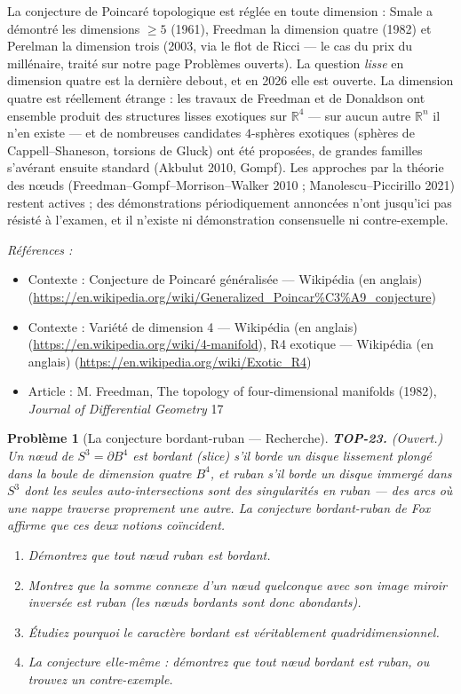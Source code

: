 \documentclass[11pt]{article}
\newtheorem{problem}{Problème}
\newenvironment{refs}{\par\small\noindent\emph{Références :}\begin{itemize}\setlength\itemsep{0pt}}{\end{itemize}\normalsize}
\begin{document}
\noindent La conjecture de Poincaré topologique est réglée en toute dimension : Smale a démontré
les dimensions $ \ge 5 $ (1961), Freedman la dimension quatre (1982) et Perelman la dimension trois
(2003, via le flot de Ricci --- le cas du prix du millénaire, traité sur notre page Problèmes ouverts). La
question \textit{lisse} en dimension quatre est la dernière debout, et en 2026 elle est ouverte. La dimension
quatre est réellement étrange : les travaux de Freedman et de Donaldson ont ensemble produit des structures
lisses exotiques sur $ \mathbb{R}^4 $ --- sur aucun autre $ \mathbb{R}^n $ il n'en existe --- et de
nombreuses candidates $ 4 $-sphères exotiques (sphères de Cappell--Shaneson, torsions de Gluck) ont été
proposées, de grandes familles s'avérant ensuite standard (Akbulut 2010, Gompf). Les approches par la
théorie des n\oe{}uds (Freedman--Gompf--Morrison--Walker 2010 ; Manolescu--Piccirillo 2021) restent actives ; des
démonstrations périodiquement annoncées n'ont jusqu'ici pas résisté à l'examen, et il n'existe ni
démonstration consensuelle ni contre-exemple.

\begin{refs}
\item Contexte : Conjecture de Poincaré généralisée --- Wikipédia (en anglais) (\url{https://en.wikipedia.org/wiki/Generalized_Poincar%C3%A9_conjecture})
\item Contexte : Variété de dimension 4 --- Wikipédia (en anglais) (\url{https://en.wikipedia.org/wiki/4-manifold}), R4 exotique --- Wikipédia (en anglais) (\url{https://en.wikipedia.org/wiki/Exotic_R4})
\item Article : M. Freedman, \og{} The topology of four-dimensional manifolds \fg{} (1982), \textit{Journal of Differential Geometry} 17
\end{refs}

\bigskip

\begin{problem}[{La conjecture bordant-ruban --- Recherche}]
\textbf{TOP-23.} (Ouvert.) Un n\oe{}ud de $ S^3 = \partial B^4 $ est \textit{bordant} (slice) s'il borde
un disque lissement plongé dans la boule de dimension quatre $ B^4 $, et \textit{ruban} s'il borde un
disque immergé dans $ S^3 $ dont les seules auto-intersections sont des singularités en ruban --- des
arcs où une nappe traverse proprement une autre. La conjecture bordant-ruban de Fox affirme que ces deux
notions coïncident.
\begin{enumerate}
\item[(a)] Démontrez que tout n\oe{}ud ruban est bordant.
\item[(b)] Montrez que la somme connexe d'un n\oe{}ud quelconque avec son image miroir inversée est ruban (les
n\oe{}uds bordants sont donc abondants).
\item[(c)] Étudiez pourquoi le caractère bordant est véritablement quadridimensionnel.
\item[(d)] La conjecture elle-même : démontrez que tout n\oe{}ud bordant est ruban, ou trouvez un
contre-exemple.
\end{enumerate}

\end{problem}
\end{document}
